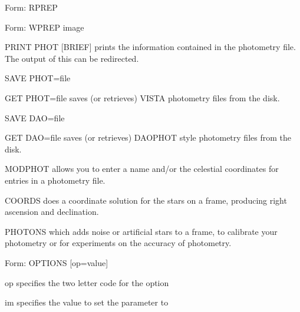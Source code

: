 {\newpage\clearpage
{}%
\begin{command}
  \item[Form: RPREP\hfill]{}
\end{command}%
\lthtmlfigureZ
\lthtmlcheckvsize\clearpage}

{\newpage\clearpage
{}%
\begin{command}
  \item[Form: WPREP image\hfill]{}
\end{command}%
\lthtmlfigureZ
\lthtmlcheckvsize\clearpage}

{\newpage\clearpage
{}%
\begin{example}
  \item[PRINT PHOT {[BRIEF]}\hfill]{prints the information contained in
       the photometry file.  The output of this can be redirected.}
  \item[SAVE PHOT=file\hfill]{}
\par\item[GET PHOT=file\hfill]{saves (or retrieves) VISTA photometry
       files from the disk.}
\par\item[SAVE DAO=file\hfill]{}
\par\item[GET DAO=file \hfill]{saves (or retrieves) DAOPHOT style photometry
       files from the disk.}
\par\item[MODPHOT\hfill]{allows you to enter a name and/or the
       celestial coordinates for entries in a photometry file.}
\end{example}%
\lthtmlfigureZ
\lthtmlcheckvsize\clearpage}

{\newpage\clearpage
{}%
\begin{example}
  \item[COORDS\hfill]{does a coordinate solution for the stars
on a frame, producing right ascension and declination.}
  \item[PHOTONS\hfill]{which adds noise or artificial stars
to a frame, to calibrate your photometry
or for experiments on the accuracy of photometry.}
\end{example}%
\lthtmlfigureZ
\lthtmlcheckvsize\clearpage}

{\newpage\clearpage
{}%
\begin{command}
  \item[Form: OPTIONS {[op=value]} \hfill]{}
  \item[op]{specifies the two letter code for the option}
  \item[im]{specifies the value to set the parameter to}
\end{command}%
\lthtmlfigureZ
\lthtmlcheckvsize\clearpage}

